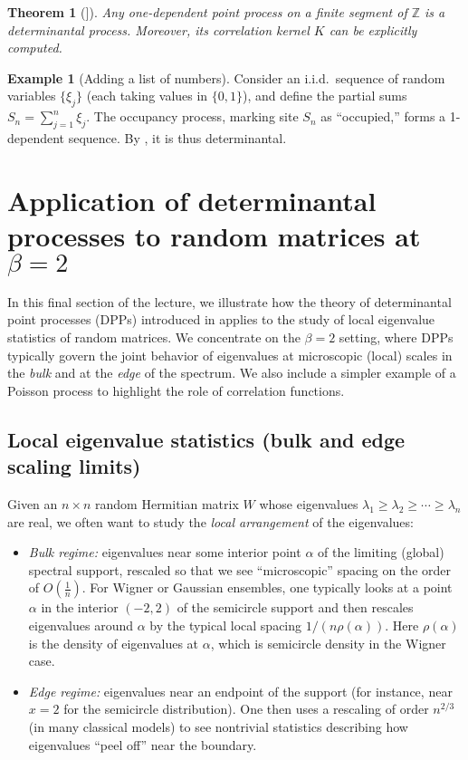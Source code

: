 \documentclass[letterpaper,11pt,oneside,reqno]{article}
\numberwithin{equation}{section}
\newtheorem{theorem}[proposition]{Theorem}
\theoremstyle{definition}
\newtheorem{example}[proposition]{Example}
\begin{document}
\begin{theorem}[{\cite[Thm.~1.1]{borodin2010adding}]}]
\label{thm:1-dependent-implies-dpp}
Any one-dependent point process on a finite segment of \(\mathbb{Z}\) is a determinantal process.
Moreover, its correlation kernel \(K\) can be explicitly computed.
\end{theorem}

\begin{example}[Adding a list of numbers]
\label{ex:adding-numbers}
Consider an i.i.d.\ sequence of random variables \(\{\xi_j\}\) (each taking values in \(\{0,1\}\)),
and define the partial sums \(S_n = \sum_{j=1}^n \xi_j\). The occupancy process,
marking site \(S_n\) as “occupied,” forms a 1-dependent sequence. By ,
it is thus determinantal.
\end{example}

\section{Application of determinantal processes to random matrices at \texorpdfstring{$\beta=2$}{beta=2}}

In this final section of the lecture, we illustrate how the theory of determinantal point processes (DPPs)
introduced in 
applies to the study of local eigenvalue statistics of random matrices.
We concentrate on the \(\beta=2\) setting, where DPPs typically
govern the joint behavior of eigenvalues at microscopic (local)
scales in the \emph{bulk} and at the \emph{edge} of the spectrum.
We also include a simpler example of a Poisson process to highlight
the role of correlation functions.

\subsection{Local eigenvalue statistics (bulk and edge scaling limits)}
\label{subsec:local-stats-intro}

Given an \(n\times n\) random Hermitian matrix \(W\) whose eigenvalues
\(\lambda_1 \ge \lambda_2 \ge \cdots \ge \lambda_n\) are real,
we often want to study the \emph{local arrangement} of the eigenvalues:
\begin{itemize}
	\item \emph{Bulk regime:}
		eigenvalues near some interior point \(\alpha\)
		of the limiting (global) spectral support, rescaled so that we see
		``microscopic'' spacing on the order of \(O(\tfrac1n)\).
		For Wigner or Gaussian ensembles, one typically looks at a point
		\(\alpha\) in the interior \((-2,2)\) of the semicircle support
		and then rescales eigenvalues around \(\alpha\) by the typical local spacing \(1/(n\rho(\alpha))\). Here $\rho(\alpha)$ is the density of eigenvalues at \(\alpha\),
		which is semicircle density in the Wigner case.
	\item \emph{Edge regime:}
		eigenvalues near an endpoint of the support
		(for instance, near \(x=2\) for the semicircle distribution).
		One then uses a rescaling of order \(n^{2/3}\) (in many classical models)
		to see nontrivial statistics describing how eigenvalues ``peel off'' near the boundary.
\end{itemize}
\end{document}
